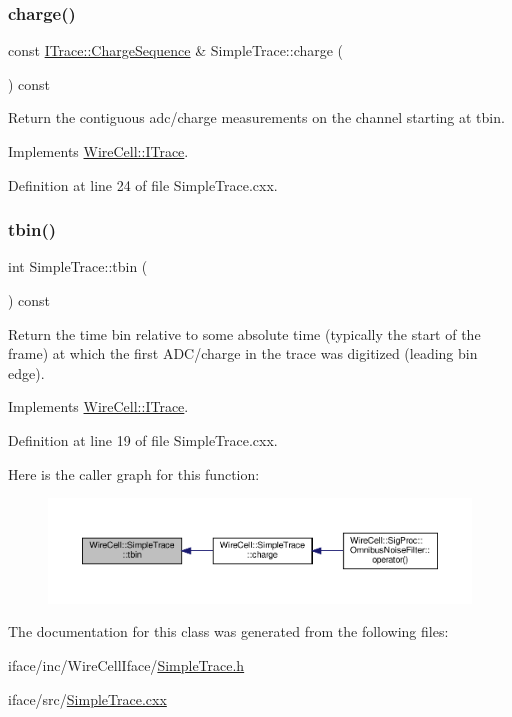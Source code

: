 \subsubsection{\texorpdfstring{charge()}{charge()}\hspace{0.1cm}{\footnotesize\ttfamily [2/2]}}
{\footnotesize\ttfamily const \hyperlink{class_wire_cell_1_1_i_trace_a3dab103257bc46bfd486966f69836954}{I\+Trace\+::\+Charge\+Sequence} \& Simple\+Trace\+::charge (\begin{DoxyParamCaption}{ }\end{DoxyParamCaption}) const\hspace{0.3cm}{\ttfamily [virtual]}}

Return the contiguous adc/charge measurements on the channel starting at tbin. 

Implements \hyperlink{class_wire_cell_1_1_i_trace_a55a746bfec82aa0214f0462ae28476e0}{Wire\+Cell\+::\+I\+Trace}.



Definition at line 24 of file Simple\+Trace.\+cxx.

\mbox{\label{class_wire_cell_1_1_simple_trace_a0a345e3606f66b64b2dbb00df7664210}} 
\subsubsection{\texorpdfstring{tbin()}{tbin()}}
{\footnotesize\ttfamily int Simple\+Trace\+::tbin (\begin{DoxyParamCaption}{ }\end{DoxyParamCaption}) const\hspace{0.3cm}{\ttfamily [virtual]}}

Return the time bin relative to some absolute time (typically the start of the frame) at which the first A\+D\+C/charge in the trace was digitized (leading bin edge). 

Implements \hyperlink{class_wire_cell_1_1_i_trace_ab8ffd89fdf73ef4b7b55af2f9c4312df}{Wire\+Cell\+::\+I\+Trace}.



Definition at line 19 of file Simple\+Trace.\+cxx.

Here is the caller graph for this function\+:
\nopagebreak
\begin{figure}[H]
\begin{center}
\leavevmode
\includegraphics[width=350pt]{class_wire_cell_1_1_simple_trace_a0a345e3606f66b64b2dbb00df7664210_icgraph}
\end{center}
\end{figure}


The documentation for this class was generated from the following files\+:\begin{DoxyCompactItemize}
\item 
iface/inc/\+Wire\+Cell\+Iface/\hyperlink{_simple_trace_8h}{Simple\+Trace.\+h}\item 
iface/src/\hyperlink{_simple_trace_8cxx}{Simple\+Trace.\+cxx}\end{DoxyCompactItemize}
